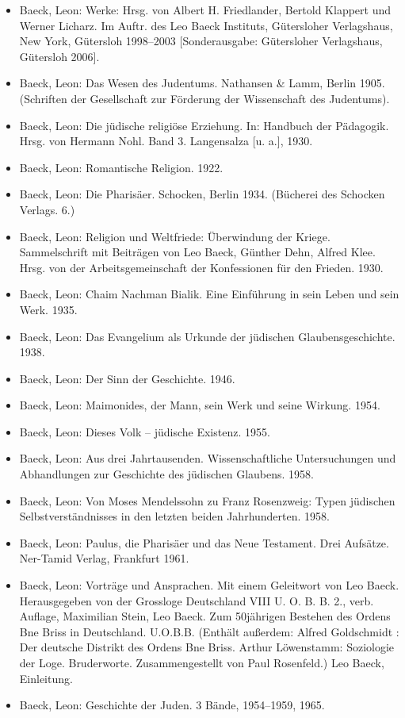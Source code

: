 \documentclass[a4paper]{article}
\begin{document}
\begin{itemize}
\item Baeck, Leon: Werke: Hrsg. von Albert H. Friedlander, Bertold Klappert und Werner Licharz. Im Auftr. des Leo Baeck
Instituts, Gütersloher Verlagshaus, New York, Gütersloh 1998–2003 [Sonderausgabe: Gütersloher Verlagshaus, Gütersloh
2006].
\item Baeck, Leon: Das Wesen des Judentums. Nathansen \& Lamm, Berlin 1905. (Schriften der Gesellschaft zur Förderung
der Wissenschaft des Judentums).  
\item Baeck, Leon: Die jüdische religiöse Erziehung. In: Handbuch der Pädagogik. Hrsg. von Hermann Nohl. Band 3.
Langensalza [u. a.], 1930.  
\item Baeck, Leon: Romantische Religion. 1922.  
\item Baeck, Leon: Die Pharisäer. Schocken, Berlin 1934. (Bücherei des Schocken Verlags. 6.)  
\item Baeck, Leon: Religion und Weltfriede: Überwindung der Kriege. Sammelschrift mit Beiträgen von Leo Baeck, Günther
Dehn, Alfred Klee. Hrsg. von der Arbeitsgemeinschaft der Konfessionen für den Frieden. 1930. 
\item Baeck, Leon: Chaim Nachman Bialik. Eine Einführung in sein Leben und sein Werk. 1935.  
\item Baeck, Leon: Das Evangelium als Urkunde der jüdischen Glaubensgeschichte. 1938.  
\item Baeck, Leon: Der Sinn der Geschichte. 1946.  
\item Baeck, Leon: Maimonides, der Mann, sein Werk und seine Wirkung. 1954.  
\item Baeck, Leon: Dieses Volk – jüdische Existenz. 1955.  
\item Baeck, Leon: Aus drei Jahrtausenden. Wissenschaftliche Untersuchungen und Abhandlungen zur Geschichte des
jüdischen Glaubens. 1958.  
\item Baeck, Leon: Von Moses Mendelssohn zu Franz Rosenzweig: Typen jüdischen Selbstverständnisses in den letzten beiden
Jahrhunderten. 1958.  
\item Baeck, Leon: Paulus, die Pharisäer und das Neue Testament. Drei Aufsätze. Ner-Tamid Verlag, Frankfurt 1961.  
\item Baeck, Leon: Vorträge und Ansprachen. Mit einem Geleitwort von Leo Baeck. Herausgegeben von der Grossloge
Deutschland VIII U. O. B. B. 2., verb. Auflage, Maximilian Stein, Leo Baeck.  Zum 50jährigen Bestehen des Ordens Bne
Briss in Deutschland. U.O.B.B. (Enthält außerdem: Alfred Goldschmidt : Der deutsche Distrikt des Ordens Bne Briss.
Arthur Löwenstamm: Soziologie der Loge. Bruderworte. Zusammengestellt von Paul Rosenfeld.) Leo Baeck, Einleitung.  
\item Baeck, Leon: Geschichte der Juden. 3 Bände, 1954–1959, 1965.
\end{itemize}
\end{document}
